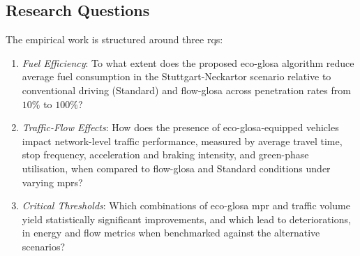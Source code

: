 \subsection{Research Questions}
\label{subsec:Research_Questions}
The empirical work is structured around three \acp{rq}:
\begin{enumerate}[label=RQ\arabic*, ref=RQ\arabic*]
  \item \label{rq1} \emph{Fuel Efficiency}: To what extent does the proposed \ac{eco-glosa} algorithm reduce average fuel consumption in the Stuttgart-Neckartor scenario relative to conventional driving (Standard) and \ac{flow-glosa} across penetration rates from $10\%$ to $100\%$?
  \item \label{rq2} \emph{Traffic-Flow Effects}: How does the presence of \ac{eco-glosa}-equipped vehicles impact network-level traffic performance, measured by average travel time, stop frequency, acceleration and braking intensity, and green-phase utilisation, when compared to \ac{flow-glosa} and Standard conditions under varying \acp{mpr}?
  \item \label{rq3} \emph{Critical Thresholds}: Which combinations of \ac{eco-glosa} \ac{mpr} and traffic volume yield statistically significant improvements, and which lead to deteriorations, in energy and flow metrics when benchmarked against the alternative scenarios?
\end{enumerate}